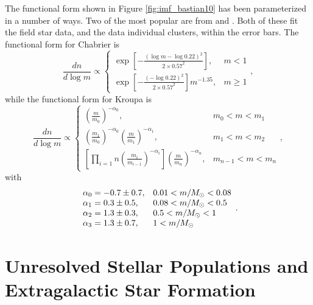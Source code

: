  The functional form shown in Figure \ref{fig:imf_bastian10} has been parameterized in a number of ways. Two of the most popular are from \citet{kroupa01a, kroupa02c} and \citet{chabrier03a, chabrier05a}. Both of these fit the field star data, and the data individual clusters, within the error bars. The functional form for Chabrier is
\begin{equation}
\label{eq:chabrier}
\frac{dn}{d\log m} \propto 
\left\{
\begin{array}{ll}
\exp\left[-\frac{(\log m-\log 0.22)^2}{2\times 0.57^2}\right], &
m<1 \\
\exp\left[-\frac{(-\log 0.22)^2}{2\times 0.57^2}\right] m^{-1.35}, &
m\ge 1
\end{array}
\right.,
\end{equation}
while the functional form for Kroupa is
\begin{equation}
\label{eq:kroupa}
\frac{dn}{d\log m} \propto
\left\{
\begin{array}{ll}
\left(\frac{m}{m_0}\right)^{-\alpha_0}, & m_0 < m < m_1\\
\left(\frac{m_1}{m_0}\right)^{-\alpha_0} \left(\frac{m}{m_1}\right)^{-\alpha_1}, &
m_1 < m < m_2 \\
\left[\prod_{i=1}{n} \left(\frac{m_i}{m_{i-1}}\right)^{-\alpha_i}\right] \left(\frac{m}{m_n}\right)^{-\alpha_n}, &
m_{n-1} < m < m_n
\end{array}
\right.,
\end{equation}
with
\begin{equation}
\begin{array}{ll}
\alpha_0 = -0.7\pm 0.7, & 0.01 < m/M_{\odot} < 0.08 \\
\alpha_1 = 0.3\pm 0.5, & 0.08 < m/M_{\odot} < 0.5 \\
\alpha_2 = 1.3\pm 0.3, & 0.5 < m/M_{\odot} < 1 \\
\alpha_3 = 1.3\pm 0.7, & 1 < m/M_{\odot} \\
\end{array}.
\end{equation}

\section{Unresolved Stellar Populations and Extragalactic Star Formation}

